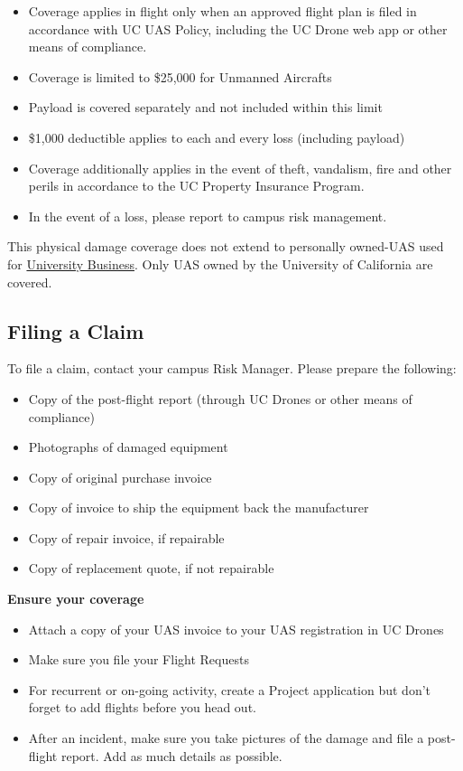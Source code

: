 \documentclass[
]{book}
\providecommand{\tightlist}{%
  \setlength{\itemsep}{0pt}\setlength{\parskip}{0pt}}
\begin{document}
\begin{itemize}
\tightlist
\item
  Coverage applies in flight only when an approved flight plan is filed in accordance with UC UAS Policy, including the UC Drone web app or other means of compliance.\\
\item
  Coverage is limited to \$25,000 for Unmanned Aircrafts
\item
  Payload is covered separately and not included within this limit
\item
  \$1,000 deductible applies to each and every loss (including payload)
\item
  Coverage additionally applies in the event of theft, vandalism, fire and other perils in accordance to the UC Property Insurance Program.
\item
  In the event of a loss, please report to campus risk management.
\end{itemize}

This physical damage coverage does not extend to personally owned-UAS used for \protect\hyperlink{UB}{University Business}. Only UAS owned by the University of California are covered.

\hypertarget{filing-a-claim}{%
\subsection{Filing a Claim}\label{filing-a-claim}}

To file a claim, contact your campus Risk Manager. Please prepare the following:

\begin{itemize}
\tightlist
\item
  Copy of the post-flight report (through UC Drones or other means of compliance)
\item
  Photographs of damaged equipment
\item
  Copy of original purchase invoice
\item
  Copy of invoice to ship the equipment back the manufacturer
\item
  Copy of repair invoice, if repairable
\item
  Copy of replacement quote, if not repairable
\end{itemize}

\textbf{Ensure your coverage}

\begin{itemize}
\tightlist
\item
  Attach a copy of your UAS invoice to your UAS registration in UC Drones
\item
  Make sure you file your Flight Requests
\item
  For recurrent or on-going activity, create a Project application but don't forget to add flights before you head out.
\item
  After an incident, make sure you take pictures of the damage and file a post-flight report. Add as much details as possible.
\end{itemize}
\end{document}
